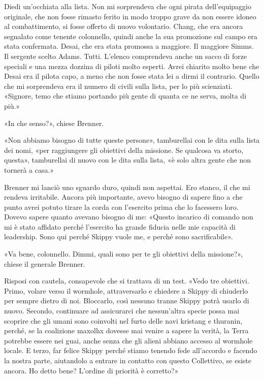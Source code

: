 Diedi un'occhiata alla lista. Non mi sorprendeva che ogni pirata
dell'equipaggio originale, che non fosse rimasto ferito in modo troppo
grave da non essere idoneo al combattimento, si fosse offerto di nuovo
volontario. Chang, che era ancora segnalato come tenente colonnello,
quindi anche la sua promozione sul campo era stata confermata. Desai,
che era stata promossa a maggiore. Il maggiore Simms. Il sergente scelto
Adams. Tutti. L'elenco comprendeva anche un sacco di forze speciali e
una mezza dozzina di piloti molto esperti. Avrei chiarito molto bene che
Desai era il pilota capo, a meno che non fosse stata lei a dirmi il
contrario. Quello che mi sorprendeva era il numero di civili sulla
lista, per lo più scienziati. «Signore, temo che stiamo portando più
gente di quanta ce ne serva, molta di più.»

«In che senso?», chiese Brenner.

«Non abbiamo bisogno di tutte queste persone», tamburellai con le dita
sulla lista dei nomi, «per raggiungere gli obiettivi della missione. Se
qualcosa va storto, questa», tamburellai di nuovo con le dita sulla
lista, «è solo altra gente che non tornerà a casa.»

Brenner mi lanciò uno sguardo duro, quindi non aspettai. Ero stanco, il
che mi rendeva irritabile. Ancora più importante, avevo bisogno di
sapere fino a che punto avrei potuto tirare la corda con l'esercito
prima che lo facessero loro. Dovevo sapere quanto avevano bisogno di me:
«Questo incarico di comando non mi è stato affidato perché l'esercito ha
grande fiducia nelle mie capacità di leadership. Sono qui perché Skippy
vuole me, e perché sono sacrificabile».

«Va bene, colonnello. Dimmi, quali sono per te gli obiettivi della
missione?», chiese il generale Brenner.

Risposi con cautela, consapevole che si trattava di un test. «Vedo tre
obiettivi. Primo, volare verso il wormhole, attraversarlo e chiedere a
Skippy di chiuderlo per sempre dietro di noi. Bloccarlo, così nessuno
tranne Skippy potrà usarlo di nuovo. Secondo, continuare ad assicurarci
che nessun'altra specie possa mai scoprire che gli umani sono coinvolti
nel furto delle navi kristang e thuranin, perché, se la coalizione
maxolhx dovesse mai venire a sapere la verità, la Terra potrebbe essere
nei guai, anche senza che gli alieni abbiano accesso al wormhole locale.
E terzo, far felice Skippy perché stiamo tenendo fede all'accordo e
facendo la nostra parte, aiutandolo a entrare in contatto con questo
Collettivo, se esiste ancora. Ho detto bene? L'ordine di priorità è
corretto?»

